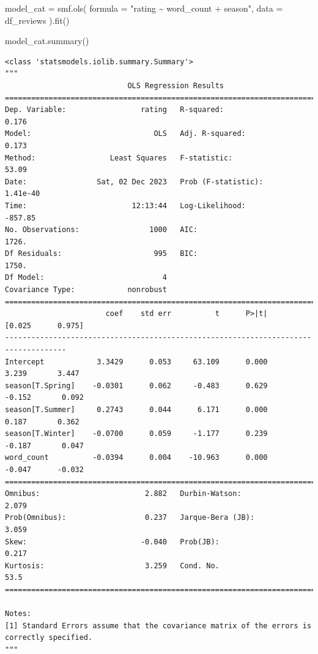\documentclass[
  letterpaper,
]{krantz}
\newenvironment{Shaded}{}{}
\newcommand{\NormalTok}[1]{#1}
\newcommand{\OperatorTok}[1]{\textcolor[rgb]{0.40,0.40,0.40}{#1}}
\newcommand{\StringTok}[1]{\textcolor[rgb]{0.25,0.44,0.63}{#1}}
\begin{document}
\begin{Shaded}
\begin{Highlighting}[]
\NormalTok{model\_cat }\OperatorTok{=}\NormalTok{ smf.ols(}
\NormalTok{    formula }\OperatorTok{=} \StringTok{"rating \textasciitilde{} word\_count + season"}\NormalTok{,}
\NormalTok{    data }\OperatorTok{=}\NormalTok{ df\_reviews}
\NormalTok{).fit()}

\NormalTok{model\_cat.summary()}
\end{Highlighting}
\end{Shaded}

\begin{verbatim}
<class 'statsmodels.iolib.summary.Summary'>
"""
                            OLS Regression Results                            
==============================================================================
Dep. Variable:                 rating   R-squared:                       0.176
Model:                            OLS   Adj. R-squared:                  0.173
Method:                 Least Squares   F-statistic:                     53.09
Date:                Sat, 02 Dec 2023   Prob (F-statistic):           1.41e-40
Time:                        12:13:44   Log-Likelihood:                -857.85
No. Observations:                1000   AIC:                             1726.
Df Residuals:                     995   BIC:                             1750.
Df Model:                           4                                         
Covariance Type:            nonrobust                                         
====================================================================================
                       coef    std err          t      P>|t|      [0.025      0.975]
------------------------------------------------------------------------------------
Intercept            3.3429      0.053     63.109      0.000       3.239       3.447
season[T.Spring]    -0.0301      0.062     -0.483      0.629      -0.152       0.092
season[T.Summer]     0.2743      0.044      6.171      0.000       0.187       0.362
season[T.Winter]    -0.0700      0.059     -1.177      0.239      -0.187       0.047
word_count          -0.0394      0.004    -10.963      0.000      -0.047      -0.032
==============================================================================
Omnibus:                        2.882   Durbin-Watson:                   2.079
Prob(Omnibus):                  0.237   Jarque-Bera (JB):                3.059
Skew:                          -0.040   Prob(JB):                        0.217
Kurtosis:                       3.259   Cond. No.                         53.5
==============================================================================

Notes:
[1] Standard Errors assume that the covariance matrix of the errors is correctly specified.
"""
\end{verbatim}
\end{document}
